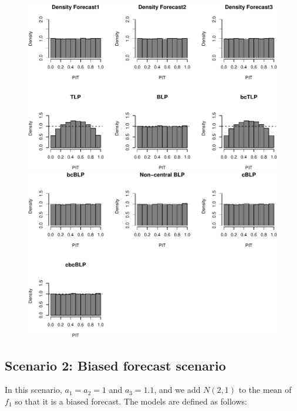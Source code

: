 \documentclass[]{article}
\begin{document}
\begin{figure}[H]

{\centering \includegraphics{Newest_BLPsim_files/figure-latex/unnamed-chunk-4-1} \includegraphics{Newest_BLPsim_files/figure-latex/unnamed-chunk-4-2} 

}

\end{figure}

\clearpage

\hypertarget{scenario-2-biased-forecast-scenario}{%
\subsection{Scenario 2: Biased forecast
scenario}\label{scenario-2-biased-forecast-scenario}}

In this scenario, \(a_1 = a_2 = 1\) and \(a_3 = 1.1\), and we add
\(N(2,1)\) to the mean of \(f_1\) so that it is a biased forecast. The
models are defined as follows:
\end{document}
